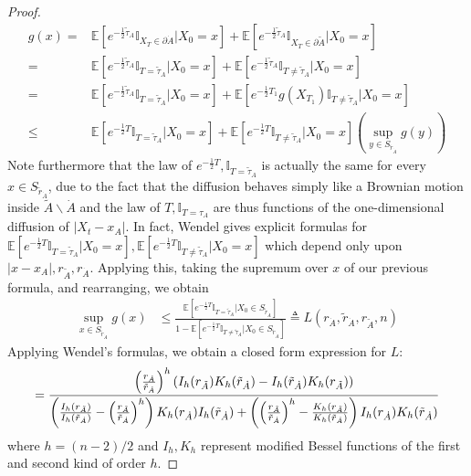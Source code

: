 \documentclass[nofootinbib,english, aip, jcp, priprint, graphicx,floatfix]{revtex4-1}
\theoremstyle{plain}
\theoremstyle{definition}
\theoremstyle{plain}
\newcommand{\indicatorf}[1]{\mathbb{I}_{#1}}
\begin{document}
\begin{proof}
\begin{align*}
	g(x) = &\mathbb{E}[e^{-\frac{1}{2}\tilde \tau_A}\indicatorf{X_T \in\partial\dot A}|X_0=x]+ \mathbb{E}[e^{-\frac{1}{2}\tilde \tau_A}\indicatorf{X_T \in\partial\tilde A}|X_0=x]\\
	    =  &\mathbb{E}[e^{-\frac{1}{2}\tilde \tau_A}\indicatorf{T=\tilde \tau_A}|X_0=x]+ \mathbb{E}[e^{-\frac{1}{2}\tilde \tau_A}\indicatorf{T\neq\tilde \tau_A}|X_0=x]\\
     = & \mathbb{E}[e^{-\frac{1}{2}\tilde \tau_A}\indicatorf{T=\tilde \tau_A}|X_0=x]+
     \mathbb{E}[e^{-\frac{1}{2}T_1}g(X_{T_1})\indicatorf{T\neq\tilde \tau_A}|X_0=x]\\
     \leq & \mathbb{E}[e^{-\frac{1}{2}T}\indicatorf{T=\tilde \tau_A}|X_0=x]+
                    \mathbb{E}[e^{-\frac{1}{2}T}\indicatorf{T\neq\tilde \tau_A}|X_0=x]\left(\sup_{y\in 
		   S_{\tilde r_{\dot A}}} g(y)\right)
\end{align*}
Note furthermore that the law of $e^{-\frac{1}{2}T},\indicatorf{T=\tilde \tau_A}$ is actually the same for every $x\in S_{\tilde r_{\dot A}}$, due to the fact that the diffusion behaves simply like a Brownian motion inside $\tilde A \backslash \dot A$ and the law of $T,\indicatorf{T=\tau_A}$ are thus functions of the one-dimensional diffusion of $|X_t-x_A|$.  In fact, Wendel\cite{Wendel1980-sj} gives explicit formulas for $\mathbb{E}[e^{-\frac{1}{2}T}\indicatorf{T=\tilde \tau_A}|X_0=x],\mathbb{E}[e^{-\frac{1}{2}T}\indicatorf{T\neq\tilde \tau_A}|X_0=x]$ which depend only upon $|x-x_A|,r_{\tilde{A}},r_{\dot A}$.  Applying this, taking the supremum over $x$ of our previous formula, and rearranging, we obtain
\begin{align*}
\sup_{x\in S_{\tilde r_{\dot A}}} g(x) &\leq \frac{\mathbb{E}[e^{-\frac{1}{2}T}\indicatorf{T=\tilde \tau_A}|X_0\in S_{\tilde r_{\dot A}}]}{1-\mathbb{E}[e^{-\frac{1}{2}T}\indicatorf{T\neq\tilde \tau_A}|X_0\in S_{\tilde r_{\dot A}}]} \triangleq L(r_{\dot A},\tilde r_{\dot A},r_{\tilde A},n)
\end{align*}
Applying Wendel's formulas, we obtain a closed form expression for $L$:
\[
=\frac{\left( \frac{r_{\dot A}}{\tilde r_{\dot A}} \right)^h (I_h (
r_{\tilde{A}}) K_h ( \tilde r_{\dot A}) - I_h ( \tilde r_{\dot A}) K_h (
r_{\tilde{A}}))}{
    \left( \frac{I_h ( r_{\tilde{A}})}{I_h ( \tilde r_{\dot A})} - \left(
\frac{r_{\tilde{A}}}{\tilde r_{\dot A}} \right)^h  \right)
K_h ( r_{\dot A}) I_h ( \tilde r_{\dot A})+ 
    \left( \left( \frac{r_{\tilde{A}}}{\tilde r_{\dot A}}
\right)^h  - \frac{K_h ( r_{\tilde{A}})}{K_h ( \tilde r_{\dot A})} \right) I_h (r_{\dot A})K_h ( \tilde r_{\dot A})}\\
\]
where $h=(n-2)/2$ and $I_h,K_h$ represent modified Bessel functions of the first and second kind of order $h$.  
 

\end{proof}
\end{document}
